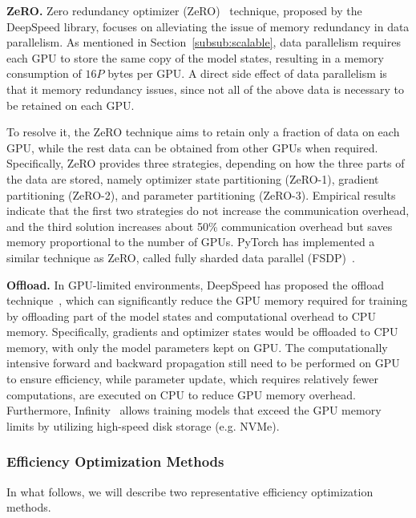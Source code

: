 \textbf{ZeRO.}
Zero redundancy optimizer (ZeRO)~\cite{Rajbhandari-IEEE-2020-ZeRO} technique, proposed by the DeepSpeed library, focuses on alleviating the issue of memory redundancy in data parallelism. As mentioned in Section~\ref{subsub:scalable}, data parallelism requires each GPU to store the same copy of  the model states, resulting in a memory consumption of $16P$ bytes per GPU. A direct side effect of data parallelism is that it memory redundancy issues, since not all of the above data is necessary to be retained on each GPU.

To resolve it, the ZeRO technique aims to retain only a fraction of data on each GPU, while the rest data can be obtained from other GPUs when required. Specifically, ZeRO provides three strategies, depending on how the three parts of the data are stored, namely optimizer state partitioning (ZeRO-1), gradient partitioning (ZeRO-2), and parameter partitioning (ZeRO-3). Empirical results indicate that the first two strategies do not increase the communication overhead, and the third solution increases about 50\% communication overhead but saves memory proportional to the number of GPUs. PyTorch has implemented a similar technique as ZeRO, called fully sharded data parallel (FSDP)~\cite{FairScale2021}.

\textbf{Offload.}
In GPU-limited environments, DeepSpeed has proposed the offload technique~\cite{Ren-USENIX-2021-ZeRO}, which can significantly reduce the GPU memory required for training by offloading part of the model states and computational overhead to CPU memory. {Specifically, gradients and optimizer states would be offloaded to CPU memory, with only the model parameters kept on GPU.} The computationally intensive forward and backward propagation still need to be performed on GPU to ensure efficiency, while {parameter update, which requires relatively fewer computations,} are executed on CPU to reduce GPU memory overhead. Furthermore, Infinity~\cite{Rajbhandari-sc-2021-zero} allows training models that exceed the GPU memory limits by utilizing high-speed disk storage (e.g. NVMe).

\subsubsection{Efficiency Optimization Methods} \label{subsub:training-effi}

In what follows, we will describe two representative efficiency optimization methods.

